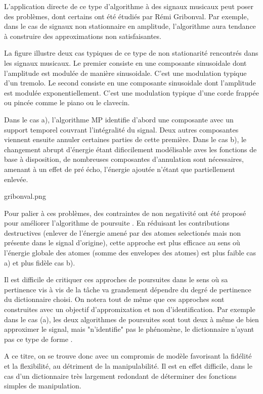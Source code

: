 L'application directe de ce type d'algorithme à des signaux musicaux peut poser des problèmes, dont certains ont été étudiés par Rémi Gribonval. Par exemple, dans le cas de signaux non stationnaire en amplitude, l'algorithme aura tendance à construire des approximations non satisfaisantes.

La figure illustre deux cas typiques de ce type de non stationarité rencontrés dans les signaux musicaux. Le premier consiste en une composante sinusoidale dont l'amplitude est modulée de manière sinusoidale. C'est une modulation typique d'un tremolo. Le second consiste en une composante sinusoidale dont l'amplitude est modulée exponentiellement. C'est une modulation typique d'une corde frappée ou pincée comme le piano ou le clavecin.

Dans le cas a), l'algorithme MP identifie d'abord une composante avec un support temporel couvrant l'intégralité du signal. Deux autres composantes viennent ensuite annuler certaines parties de cette première. Dans le cas b), le changement abrupt d'énergie étant dificcilement modélisable aves les fonctions de base à disposition, de nombreuses composantes d'annulation sont nécessaires, amenant à un effet de pré écho, l'énergie ajoutée n'étant que partiellement enlevée.

gribonval.png

Pour palier à ces problèmes, des contraintes de non negativité ont été proposé pour améliorer l'algorithme de poursuite \cite{gribonval1996sound}. En réduisant les contributions destructives (enlever de l'énergie amené par des atomes selectionés mais non présente dans le signal d'origine), cette approche est plus efficace au sens où l'énergie globale des atomes (somme des envelopes des atomes) est plus faible cas a)  et plus fidèle cas b).

Il est difficile de critiquer ces approches de poursuites dans le sens où sa pertinence vis à vis de la tâche va grandement dépendre du degré de pertinence du dictionnaire choisi. On notera tout de même que ces approches sont construites avec un objectif d'appromixation et non d'identification. Par exemple dans le cas (a), les deux algorithmes de poursuites sont tout deux à même de bien approximer le signal, mais "n'identifie" pas le phénomène, le dictionnaire n'ayant pas ce type de forme .

A ce titre, on se trouve donc avec un compromis de modèle favorisant la fidélité et la flexibilité, au détriment de la manipulabilité. Il est en effet difficile, dans le cas d'un dictionnaire très largement redondant de déterminer des fonctions simples de manipulation.

